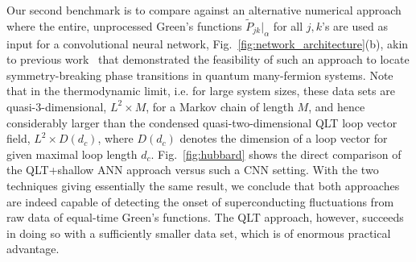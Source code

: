 \documentclass[amsmath,amssymb, aps, prx, longbibliography, twocolumn]{revtex4-1}
\begin{document}
%
Our second benchmark is to compare against an alternative numerical approach where the entire, unprocessed Green's functions 
$\widetilde{P}_{jk}|_{\alpha}$ for all $j,k$'s are used as input for a convolutional neural network, Fig.~\ref{fig:network_architecture}(b), akin to previous work~\cite{Simon2016} that demonstrated the feasibility of such an approach to  locate symmetry-breaking phase transitions in quantum many-fermion systems. Note that in the thermodynamic limit, i.e. for large system sizes, these data sets are quasi-3-dimensional, $L^2 \times M$, for a Markov chain of length $M$, and hence considerably larger than the condensed quasi-two-dimensional QLT loop vector field, $L^2 \times D(d_c)$, where $D(d_c)$ denotes the dimension of a loop vector for given maximal loop length $d_c$.
Fig.~\ref{fig:hubbard} shows the direct comparison of the QLT+shallow ANN approach versus such a CNN setting. With the two techniques giving essentially the same result, we conclude that  both approaches are indeed capable of detecting the onset of superconducting fluctuations from raw data of equal-time Green's functions. The QLT approach, however, succeeds in doing so with a sufficiently smaller data set, which is of enormous practical advantage.
\end{document}

